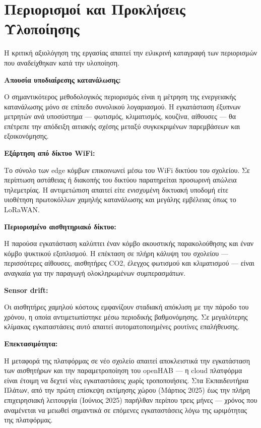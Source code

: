 \section{Περιορισμοί και Προκλήσεις Υλοποίησης}
Η κριτική αξιολόγηση της εργασίας απαιτεί την ειλικρινή καταγραφή των περιορισμών που αναδείχθηκαν κατά την υλοποίηση.

\noindent\textbf{Απουσία υποδιαίρεσης κατανάλωσης:}

Ο σημαντικότερος μεθοδολογικός περιορισμός είναι η μέτρηση της ενεργειακής κατανάλωσης μόνο σε επίπεδο συνολικού λογαριασμού. Η εγκατάσταση έξυπνων μετρητών ανά υποσύστημα --- φωτισμός, κλιματισμός, κουζίνα, αίθουσες --- θα επέτρεπε την απόδειξη αιτιακής σχέσης μεταξύ συγκεκριμένων παρεμβάσεων και εξοικονόμησης.

\noindent\textbf{Εξάρτηση από δίκτυο \textlatin{WiFi}:}

Το σύνολο των \textlatin{edge} κόμβων επικοινωνεί μέσω του \textlatin{WiFi} δικτύου του σχολείου. Σε περίπτωση αστάθειας ή διακοπής του δικτύου παρατηρείται προσωρινή απώλεια τηλεμετρίας. Η αντιμετώπιση απαιτεί είτε ενισχυμένη δικτυακή υποδομή είτε υιοθέτηση πρωτοκόλλων χαμηλής κατανάλωσης και μεγάλης εμβέλειας όπως το \textlatin{LoRaWAN}.

\noindent\textbf{Περιορισμένο αισθητηριακό δίκτυο:}

Η παρούσα εγκατάσταση καλύπτει έναν κόμβο ακουστικής παρακολούθησης και έναν κόμβο ψυκτικού εξοπλισμού. Η επέκταση σε πλήρη κάλυψη του σχολείου --- περισσότερες αίθουσες, αισθητήρες \textlatin{CO2}, έλεγχος φωτισμού και κλιματισμού --- είναι αναγκαία για την παραγωγή ολοκληρωμένων συμπερασμάτων.

\noindent\textbf{\textlatin{Sensor drift}:}

Οι αισθητήρες χαμηλού κόστους εμφανίζουν σταδιακή απόκλιση με την πάροδο του χρόνου, η οποία αντιμετωπίστηκε μέσω περιοδικής βαθμονόμησης. Σε μεγαλύτερης κλίμακας εγκαταστάσεις αυτό απαιτεί αυτοματοποιημένες ρουτίνες επαλήθευσης.

\noindent\textbf{Επεκτασιμότητα:}

Η μεταφορά της πλατφόρμας σε νέο σχολείο απαιτεί αποκλειστικά την εγκατάσταση των αισθητήρων και την παραμετροποίηση του \textlatin{openHAB} --- η \textlatin{cloud} πλατφόρμα είναι έτοιμη να δεχτεί νέες εγκαταστάσεις χωρίς τροποποιήσεις. Στα Εκπαιδευτήρια Πλάτων, από την πρώτη επίσκεψη εκτίμησης χώρου (Μάρτιος 2025) έως την πλήρη επιχειρησιακή λειτουργία (Ιούνιος 2025) παρήλθαν περίπου τρεις μήνες --- χρόνος που αναμένεται να μειωθεί σημαντικά σε επόμενες εγκαταστάσεις λόγω της ωριμότητας της πλατφόρμας.

